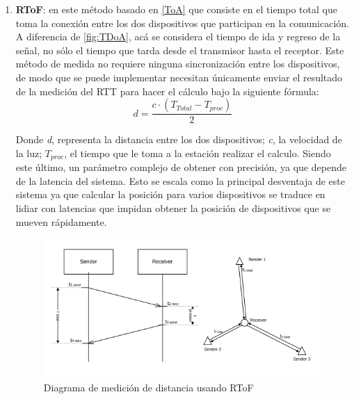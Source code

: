 \begin{itemize}
{\begin{enumerate}
{        }
        \newpage 
        \item {\textbf{\ac{RToF}}: en este método basado en \ref{ToA} que consiste en el tiempo total que toma la conexión entre los dos dispositivos que participan en la comunicación. A diferencia de \ref{fig:TDoA}, acá se considera el tiempo de ida y regreso de la señal, no sólo el tiempo que tarda desde el transmisor hasta el receptor. Este método de medida no requiere ninguna sincronización entre los dispositivos, de modo que se puede implementar necesitan únicamente enviar el resultado de la medición del \ac{RTT} para hacer el cálculo bajo la siguiente fórmula:\\
        
        \begin{equation}
            d = \dfrac{c\cdot{\left(T_{Total} - T_{proc}\right)}}{2}
        \end{equation}
        
        Donde \textit{d}, representa la distancia entre los dos dispositivos; \textit{c}, la velocidad de la luz; $T_{proc}$, el tiempo que le toma a la estación realizar el calculo. Siendo este último, un parámetro complejo de obtener con precisión, ya que depende de la latencia del sistema. Esto se escala como la principal desventaja de este sistema ya que calcular la posición para varios dispositivos se traduce en lidiar con latencias que impidan obtener la posición de dispositivos que se mueven rápidamente.
        
        \begin{figure}[h!]
            \centering
            \includegraphics[scale=0.52]{./images/rtof}
            \caption{Diagrama de medición de distancia usando \ac{RToF}}
            \label{fig:RTOF}
        \end{figure}
        }
    \end{enumerate}
            }


\end{itemize}
